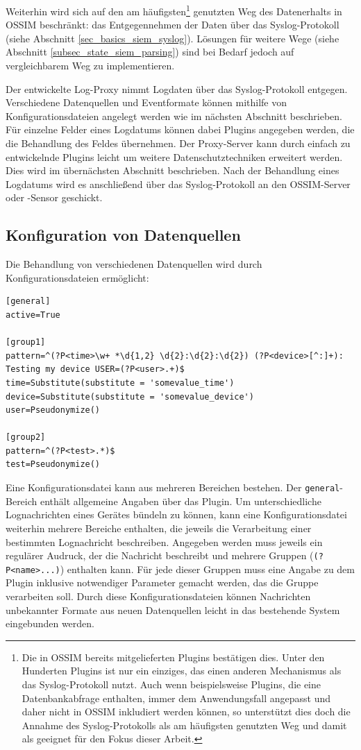 Weiterhin wird sich auf den am häufigsten\footnote{
  Die in OSSIM bereits mitgelieferten Plugins bestätigen dies. Unter den Hunderten Plugins ist nur ein einziges, das einen anderen Mechanismus als das Syslog-Protokoll nutzt. Auch wenn beispielsweise Plugins, die eine Datenbankabfrage enthalten, immer dem Anwendungsfall angepasst und daher nicht in OSSIM inkludiert werden können, so unterstützt dies doch die Annahme des Syslog-Protokolls als am häufigsten genutzten Weg und damit als geeignet für den Fokus dieser Arbeit.
} genutzten Weg des Datenerhalts in OSSIM beschränkt: das Entgegennehmen der Daten über das Syslog-Protokoll (siehe Abschnitt \ref{sec_basics_siem_syslog}). Lösungen für weitere Wege (siehe Abschnitt \ref{subsec_state_siem_parsing}) sind bei Bedarf jedoch auf vergleichbarem Weg zu implementieren.

Der entwickelte Log-Proxy nimmt Logdaten über das Syslog-Protokoll entgegen. Verschiedene Datenquellen und Eventformate können mithilfe von Konfigurationsdateien angelegt werden wie im nächsten Abschnitt beschrieben. Für einzelne Felder eines Logdatums können dabei Plugins angegeben werden, die die Behandlung des Feldes übernehmen. Der Proxy-Server kann durch einfach zu entwickelnde Plugins leicht um weitere Datenschutztechniken erweitert werden. Dies wird im übernächsten Abschnitt beschrieben. Nach der Behandlung eines Logdatums wird es anschließend über das Syslog-Protokoll an den OSSIM-Server oder -Sensor geschickt.

\subsection{Konfiguration von Datenquellen}
\label{sec_integration_in_ossim_datasource_config}

Die Behandlung von verschiedenen Datenquellen wird durch Konfigurationsdateien ermöglicht:

\begin{lstlisting}[morekeywords={general,active,pattern,group1,group2}]
[general]
active=True

[group1]
pattern=^(?P<time>\w+ *\d{1,2} \d{2}:\d{2}:\d{2}) (?P<device>[^:]+): Testing my device USER=(?P<user>.+)$
time=Substitute(substitute = 'somevalue_time')
device=Substitute(substitute = 'somevalue_device')
user=Pseudonymize()

[group2]
pattern=^(?P<test>.*)$
test=Pseudonymize()
\end{lstlisting}

Eine Konfigurationsdatei kann aus mehreren Bereichen bestehen. Der \texttt{general}-Bereich enthält allgemeine Angaben über das Plugin. Um unterschiedliche Lognachrichten eines Gerätes bündeln zu können, kann eine Konfigurationsdatei weiterhin mehrere Bereiche enthalten, die jeweils die Verarbeitung einer bestimmten Lognachricht beschreiben. Angegeben werden muss jeweils ein regulärer Audruck, der die Nachricht beschreibt und mehrere Gruppen (\texttt{(?P<name>...)}) enthalten kann. Für jede dieser Gruppen muss eine Angabe zu dem Plugin inklusive notwendiger Parameter gemacht werden, das die Gruppe verarbeiten soll. Durch diese Konfigurationsdateien können Nachrichten unbekannter Formate aus neuen Datenquellen leicht in das bestehende System eingebunden werden.

